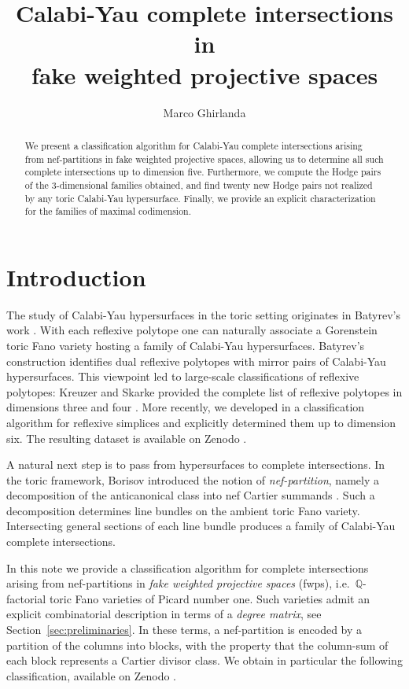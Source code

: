 \documentclass{amsart}
\title[Calabi-Yau complete intersections in fwps]{Calabi-Yau complete intersections in \\ fake weighted projective spaces}
\author{Marco Ghirlanda}
\date{}
\newcommand{\Q}{\mathbb{Q}}
\theoremstyle{definition}
\begin{document}
\begin{abstract}
We present a classification algorithm for Calabi-Yau complete intersections arising from nef-partitions in fake weighted projective spaces, allowing us to determine all such complete intersections up to dimension five. Furthermore, we compute the Hodge pairs of the $3$-dimensional families obtained, and find twenty new Hodge pairs not realized by any toric Calabi-Yau hypersurface. Finally, we provide an explicit characterization for the families of maximal codimension.
\end{abstract}

\maketitle

\section{Introduction}

The study of Calabi-Yau hypersurfaces in the toric setting originates in Batyrev's work \cite{B}. With each reflexive polytope one can naturally associate a Gorenstein toric Fano variety hosting a family of Calabi-Yau hypersurfaces. Batyrev's construction identifies dual reflexive polytopes with mirror pairs of Calabi-Yau hypersurfaces. This viewpoint led to large-scale classifications of reflexive polytopes: Kreuzer and Skarke provided the complete list of reflexive polytopes in dimensions three \cite{KS3} and four \cite{KS4}. More recently, we developed in \cite{Ghi} a classification algorithm for reflexive simplices and explicitly determined them up to dimension six. The resulting dataset is available on Zenodo \cite{zenodo:17296449}.

A natural next step is to pass from hypersurfaces to complete intersections. In the toric framework,
Borisov introduced the notion of \emph{nef-partition}, namely a decomposition of the anticanonical class
into nef Cartier summands \cite{Bor}. Such a decomposition determines line bundles on the ambient toric
Fano variety. Intersecting general sections of each line bundle produces a family of Calabi-Yau complete intersections.

In this note we provide a classification algorithm for complete intersections arising from nef-partitions
in \emph{fake weighted projective spaces} (fwps), i.e.\ $\Q$-factorial toric Fano varieties of Picard number one.
Such varieties admit an explicit combinatorial description in terms of a \emph{degree matrix}, see
Section~\ref{sec:preliminaries}. In these terms, a nef-partition is encoded by a partition of the columns
into blocks, with the property that the column-sum of each block represents a Cartier divisor class.
We obtain in particular the following classification, available on Zenodo \cite{zenodo:CYCI-fwps}.
\end{document}
